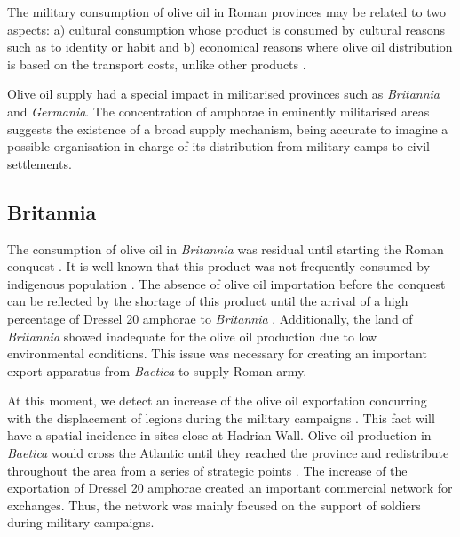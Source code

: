 \documentclass[review]{elsarticle}
\newcommand{\memo}[2]{\textcolor{#1}{#2}}
\newcommand{\xavi}[1]{\memo{magenta}{XRC: #1\\}}
\begin{document}
 
The military consumption of olive oil in Roman provinces may be related to two aspects: a) cultural consumption whose product is consumed by cultural reasons such as to identity or habit and b) economical reasons where olive oil distribution is based on the transport costs, unlike other products \citep[69-70]{carreras_britannia_1998}. 

Olive oil supply had a special impact in militarised provinces such as \textit{Britannia} and \textit{Germania}. The concentration of amphorae in eminently militarised areas suggests the existence of a broad supply mechanism, being accurate to imagine a possible organisation in charge of its distribution from military camps to civil settlements\citep{remesal_annona_1986, carreras_britannia_1998}.

 


\subsection{Britannia}

The consumption of olive oil in \textit{Britannia} was residual until starting the Roman conquest \citep{funari_corpus_1996,
carreras_abastecimiento_2003}. It is well known that this product was not frequently consumed by indigenous population \citep[161]{monfort_britanniaen_1998}. The absence of olive oil importation before the conquest can be reflected by the shortage of this product until the arrival of a high percentage of Dressel 20 amphorae to \textit{Britannia} \citep[1]{carreras_britannia_1998}. Additionally, the land of \textit{Britannia} showed inadequate for the olive oil production due to low environmental conditions. This issue was necessary for creating an important export apparatus from \textit{Baetica} to supply Roman army.

At this moment, we detect an increase of the olive oil exportation concurring with the displacement of legions during the military campaigns \citep[161]{monfort_britanniaen_1998}. This fact will have a spatial incidence in sites close at Hadrian Wall.  
Olive oil production in \textit{Baetica} would cross the Atlantic until they reached the province and redistribute throughout the area from a series of strategic points \citep{carreras_atlantic_2012}. The increase of the exportation of Dressel 20 amphorae created an important commercial network for exchanges. Thus, the network was mainly focused on the support of soldiers during military campaigns. 
\end{document}
